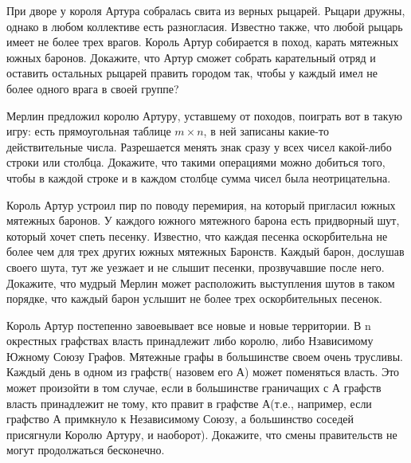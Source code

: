 \begin{problems}

\item При дворе у короля Артура собралась свита из верных рыцарей. Рыцари дружны, однако в любом коллективе есть разногласия. Известно также, что любой рыцарь имеет не более трех врагов.  Король Артур собирается в поход, карать мятежных южных баронов. Докажите, что Артур сможет собрать карательный отряд и оставить остальных рыцарей править городом так, чтобы у каждый имел не более одного врага в своей группе?


\item Мерлин предложил королю Артуру, уставшему от походов, поиграть вот в такую игру: есть прямоугольная таблице $ m \times n$,  в ней записаны какие-то действительные числа. Разрешается менять знак сразу у всех чисел какой-либо строки или столбца. Докажите, что такими операциями можно добиться того, чтобы в каждой строке и в каждом столбце сумма чисел была неотрицательна.

\item Король Артур устроил пир по поводу перемирия, на который пригласил южных мятежных баронов. У каждого южного мятежного барона есть придворный шут, который хочет спеть песенку. Известно, что каждая песенка оскорбительна не более чем для
трех других южных мятежных Баронств. Каждый барон, дослушав своего шута, тут же уезжает и не слышит песенки, прозвучавшие после него. Докажите, что мудрый Мерлин может расположить выступления шутов в таком порядке, что каждый барон услышит не более трех оскорбительных песенок.



\item Король Артур постепенно завоевывает все новые и новые территории. В n окрестных графствах власть принадлежит либо королю, либо Нзависимому Южному Союзу Графов. Мятежные графы в большинстве своем очень трусливы. Каждый день в одном из графств( назовем его А) может поменяться власть. Это может произойти в том случае, если в большинстве граничащих с А графств власть принадлежит не тому, кто правит в графстве А(т.е., например,  если графство А примкнуло к Независимому Союзу, а большинство соседей присягнули Королю Артуру, и наоборот). Докажите, что смены правительств не могут продолжаться бесконечно. 


\end{problems}
